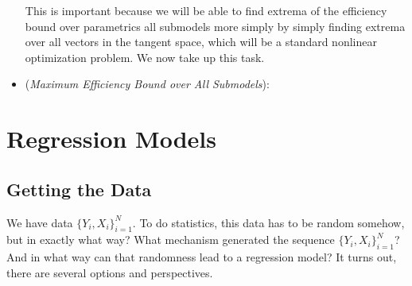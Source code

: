 \documentclass[12pt]{article}
\theoremstyle{plain}
\theoremstyle{definition}
\theoremstyle{remark}
\begin{document}
\begin{itemize}
    This is important because we will be able to find extrema of the
    efficiency bound over parametrics all submodels more simply by
    simply finding extrema over all vectors in the tangent space, which
    will be a standard nonlinear optimization problem.
    We now take up this task.


  \item
    (\emph{Maximum Efficiency Bound over All Submodels}):




\end{itemize}



\clearpage
\section{Regression Models}

\subsection{Getting the Data}

We have data $\{Y_i,X_i\}_{i=1}^N$.
To do statistics, this data has to be random somehow, but in exactly
what way?
What mechanism generated the sequence $\{Y_i,X_i\}_{i=1}^N$?
And in what way can that randomness lead to a regression model?
It turns out, there are several options and perspectives.
\end{document}
